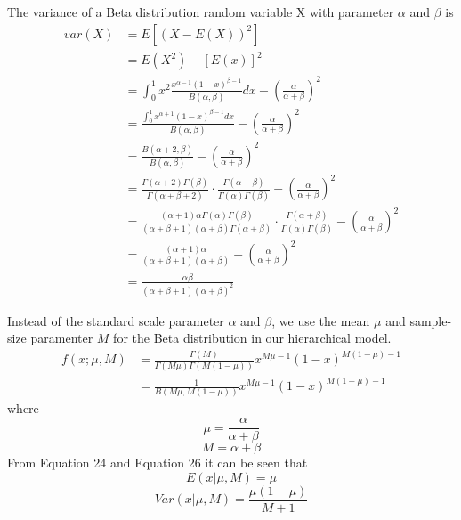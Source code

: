 \documentclass[11pt,reqno]{amsart}
\begin{document}
The variance of a Beta distribution random variable X with parameter $\alpha$ and $\beta$ is 
\begin{equation}
\begin{split}
  var(X) &= E[(X-E(X))^2]\\ &= E(X^2)-[E(x)]^2\\ &=\int_0^1x^2\frac{x^{\alpha-1}(1-x)^{\beta-1}}{B(\alpha,\beta)}dx-\left(\frac{\alpha}{\alpha+\beta}\right)^2\\ &= \frac{\int_0^1x^{\alpha+1}(1-x)^{\beta-1}dx}{B(\alpha,\beta)}-\left(\frac{\alpha}{\alpha+\beta}\right)^2\\ &= \frac{B(\alpha+2,\beta)}{B(\alpha,\beta)}-\left(\frac{\alpha}{\alpha+\beta}\right)^2\\ &= \frac{\Gamma(\alpha+2)\Gamma(\beta)}{\Gamma(\alpha+\beta+2)}\cdot\frac{\Gamma(\alpha+\beta)}{\Gamma(\alpha)\Gamma(\beta)}-\left(\frac{\alpha}{\alpha+\beta}\right)^2\\ &= \frac{(\alpha+1)\alpha\Gamma(\alpha)\Gamma(\beta)}{(\alpha+\beta+1)(\alpha+\beta)\Gamma(\alpha+\beta)}\cdot\frac{\Gamma(\alpha+\beta)}{\Gamma(\alpha)\Gamma(\beta)}-\left(\frac{\alpha}{\alpha+\beta}\right)^2\\ &= \frac{(\alpha+1)\alpha}{(\alpha+\beta+1)(\alpha+\beta)}-\left(\frac{\alpha}{\alpha+\beta}\right)^2\\ &= \frac{\alpha\beta}{(\alpha+\beta+1)(\alpha+\beta)^2}
\end{split}
\end{equation}

Instead of the standard scale parameter $\alpha$ and $\beta$, we use the mean $\mu$ and sample-size paramenter $M$ for the Beta distribution in our hierarchical model.
\begin{equation}
\begin{split}
  f(x;\mu,M) &=\frac{\Gamma(M)}{\Gamma(M\mu)\Gamma(M(1-\mu))}x^{M\mu-1}(1-x)^{M(1-\mu)-1}\\ &= \frac{1}{B(M\mu,M(1-\mu))}x^{M\mu-1}(1-x)^{M(1-\mu)-1}
\end{split}
\end{equation}
where 
\begin{equation}
 \mu = \frac{\alpha}{\alpha+\beta}
\end{equation}
\begin{equation}
 M = \alpha+\beta
\end{equation}
From Equation 24 and Equation 26 it can be seen that
\begin{equation}
 E(x|\mu,M) = \mu
\end{equation}
\begin{equation}
 Var(x|\mu,M) = \frac{\mu(1-\mu)}{M+1}
\end{equation}




\end{document}

